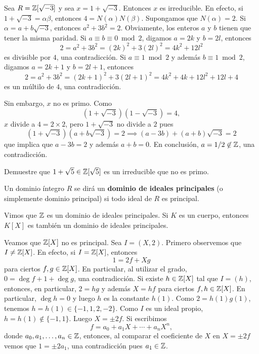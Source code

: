 \begin{example}
Sea $R=\mathbb{Z}[\sqrt{-3}]$ y sea $x=1+\sqrt{-3}$. Entonces $x$ es irreducible. En efecto,
si $1+\sqrt{-3}=\alpha\beta$, entonces $4=N(\alpha)N(\beta)$. 
Supongamos que $N(\alpha)=2$. Si $\alpha=a+b\sqrt{-3}$, entonces
$a^2+3b^2=2$. Obviamente, los enteros $a$ y $b$ tienen que tener la misma paridad. 
Si $a\equiv b\equiv 0\bmod 2$, digamos $a=2k$ y $b=2l$, entonces
\[
2=a^2+3b^2=(2k)^2+3(2l)^2=4k^2+12l^2
\]
es divisible por $4$, una contradicción. Si $a\equiv 1\bmod 2$ y además $b\equiv 1\bmod 2$, digamos
$a=2k+1$ y $b=2l+1$, entonces
\[
2=a^2+3b^2=(2k+1)^2+3(2l+1)^2=4k^2+4k+12l^2+12l+4
\]
es un múltilo de $4$, una contradicción. 

Sin embargo, $x$ no es primo. Como
\[
(1+\sqrt{-3})(1-\sqrt{-3})=4,
\]
$x$ divide a $4=2\times 2$, pero $1+\sqrt{-3}$ no divide a $2$ pues 
\[
(1+\sqrt{-3})(a+b\sqrt{-3})=2\implies
(a-3b)+(a+b)\sqrt{-3}=2
\]
que implica que $a-3b=2$ y además $a+b=0$. En conclusión, $a=1/2\not\in\mathbb{Z}$, una contradicción. 
\end{example}

\begin{exercise}
Demuestre que $1+\sqrt{5}\in\mathbb{Z}[\sqrt{5}]$ es un irreducible que no es primo.	
\end{exercise}

\begin{definition}
Un dominio íntegro $R$ se dirá un \textbf{dominio de ideales principales} (o simplemente dominio principal) si 
todo ideal de $R$ es principal. 	
\end{definition}

Vimos que $\mathbb{Z}$ es un dominio de ideales principales. Si $K$ es un cuerpo, entonces
$K[X]$ es también un dominio de ideales principales.

\begin{example}
Veamos que $\mathbb{Z}[X]$ no es principal. Sea $I=(X,2)$.
Primero observemos que $I\ne\mathbb{Z}[X]$. En efecto, si $I=\mathbb{Z}[X]$, entonces
\[
1=2f+Xg
\]
para ciertos $f,g\in\mathbb{Z}[X]$. En particular, al utilizar el grado, $0=\deg f+1+\deg g$, una contradicción. 
Si existe $h\in\mathbb{Z}[X]$ tal que $I=(h)$, entonces, en particular, $2=hg$ y además $X=hf$ para ciertos $f,h\in\mathbb{Z}[X]$. 
En particular, $\deg h=0$ y luego $h$ es la constante $h(1)$. Como $2=h(1)g(1)$, tenemos 
$h=h(1)\in\{-1,1,2,-2\}$. Como $I$ es un ideal propio,
$h=h(1)\not\in\{-1,1\}$. Luego  
$X=\pm 2f$. Si escribimos 
\[
f=a_0+a_1X+\cdots+a_nX^n,
\]
donde $a_0,a_1,\dots,a_n\in\mathbb{Z}$, entonces, al comparar el coeficiente de $X$ en $X=\pm 2f$ 
vemos que 
$1=\pm 2a_1$, una contradicción pues $a_1\in\mathbb{Z}$. 
\end{example}

